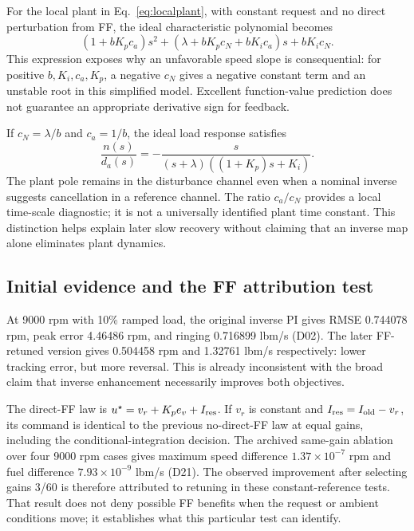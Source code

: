 For the local plant in Eq.~\eqref{eq:localplant}, with constant request and no direct perturbation from FF, the ideal characteristic polynomial becomes
\begin{equation}
(1+bK_pc_a)s^2+(\lambda+bK_pc_N+bK_ic_a)s+bK_ic_N.
\label{eq:char}
\end{equation}
This expression exposes why an unfavorable speed slope is consequential: for positive $b,K_i,c_a,K_p$, a negative $c_N$ gives a negative constant term and an unstable root in this simplified model. Excellent function-value prediction does not guarantee an appropriate derivative sign for feedback.

If $c_N=\lambda/b$ and $c_a=1/b$, the ideal load response satisfies
\begin{equation}
\frac{n(s)}{d_a(s)}=-\frac{s}{(s+\lambda)((1+K_p)s+K_i)}.
\end{equation}
The plant pole remains in the disturbance channel even when a nominal inverse suggests cancellation in a reference channel. The ratio $c_a/c_N$ provides a local time-scale diagnostic; it is not a universally identified plant time constant. This distinction helps explain later slow recovery without claiming that an inverse map alone eliminates plant dynamics.

\subsection{Initial evidence and the FF attribution test}
At 9000 rpm with 10\% ramped load, the original inverse PI gives RMSE 0.744078 rpm, peak error 4.46486 rpm, and ringing 0.716899 lbm/s (D02). The later FF-retuned version gives 0.504458 rpm and 1.32761 lbm/s respectively: lower tracking error, but more reversal. This is already inconsistent with the broad claim that inverse enhancement necessarily improves both objectives.

The direct-FF law is $u^\star=v_r+K_pe_v+I_{\rm res}$. If $v_r$ is constant and $I_{\rm res}=I_{\rm old}-v_r$, its command is identical to the previous no-direct-FF law at equal gains, including the conditional-integration decision. The archived same-gain ablation over four 9000 rpm cases gives maximum speed difference $1.37\times10^{-7}$ rpm and fuel difference $7.93\times10^{-9}$ lbm/s (D21). The observed improvement after selecting gains 3/60 is therefore attributed to retuning in these constant-reference tests. That result does not deny possible FF benefits when the request or ambient conditions move; it establishes what this particular test can identify.

